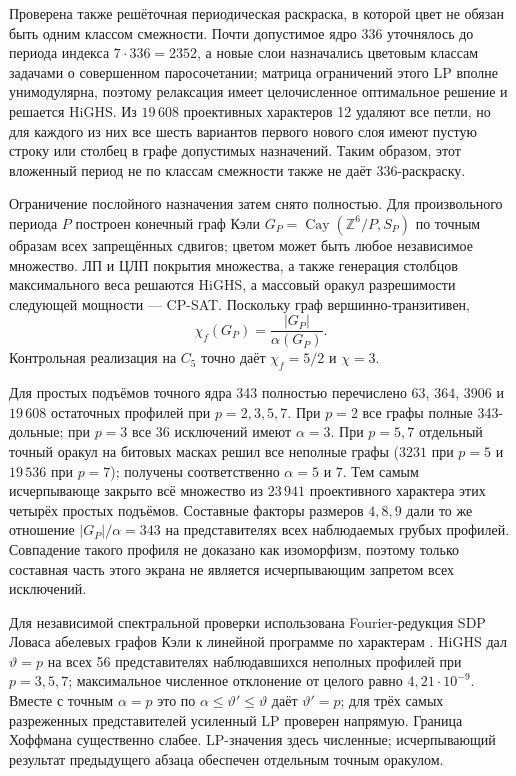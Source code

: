 Проверена также решёточная периодическая раскраска, в которой цвет не обязан
быть одним классом смежности. Почти допустимое ядро 336 уточнялось до периода
индекса $7\cdot336=2352$, а новые слои назначались цветовым классам задачами
о совершенном паросочетании; матрица ограничений этого LP вполне
унимодулярна, поэтому релаксация имеет целочисленное оптимальное решение и
решается HiGHS. Из $19\,608$ проективных характеров 12 удаляют все петли, но для каждого
из них все шесть вариантов первого нового слоя имеют пустую строку или
столбец в графе допустимых назначений. Таким образом, этот вложенный
период не по классам смежности также не даёт 336-раскраску.

Ограничение послойного назначения затем снято полностью. Для произвольного
периода $P$ построен конечный граф Кэли
$G_P=\operatorname{Cay}(\mathbb Z^6/P,S_P)$ по точным образам всех
запрещённых сдвигов; цветом может быть любое независимое множество.
ЛП и ЦЛП покрытия множества, а также генерация столбцов
максимального веса решаются HiGHS, а массовый
оракул разрешимости следующей мощности --- CP-SAT. Поскольку граф
вершинно-транзитивен,
\[
  \chi_f(G_P)=\frac{|G_P|}{\alpha(G_P)}.
\]
Контрольная реализация на $C_5$ точно даёт $\chi_f=5/2$ и $\chi=3$.

Для простых подъёмов точного ядра 343 полностью перечислено $63$, $364$,
$3906$ и $19\,608$ остаточных профилей при $p=2,3,5,7$. При $p=2$ все графы
полные 343-дольные; при $p=3$ все 36 исключений имеют $\alpha=3$. При $p=5,7$
отдельный точный оракул на битовых масках решил все неполные графы ($3231$
при $p=5$ и $19\,536$ при $p=7$); получены соответственно $\alpha=5$ и $7$.
Тем самым исчерпывающе закрыто всё множество из $23\,941$ проективного
характера этих четырёх простых подъёмов. Составные
факторы размеров $4,8,9$ дали то же отношение $|G_P|/\alpha=343$ на
представителях всех наблюдаемых грубых профилей. Совпадение такого профиля
не доказано как изоморфизм, поэтому только составная часть этого экрана не
является исчерпывающим запретом всех исключений.

Для независимой спектральной проверки использована Fourier-редукция SDP
Ловаса абелевых графов Кэли к линейной программе по характерам
\cite{DeCorteDeLaatVallentin}. HiGHS дал $\vartheta=p$ на всех 56
представителях наблюдавшихся неполных профилей при $p=3,5,7$; максимальное
численное отклонение от целого равно $4{,}21\cdot10^{-9}$. Вместе с точным
$\alpha=p$ это по $\alpha\le\vartheta'\le\vartheta$ даёт
$\vartheta'=p$; для трёх самых разреженных представителей усиленный LP
проверен напрямую. Граница Хоффмана существенно слабее. LP-значения здесь
численные; исчерпывающий результат предыдущего абзаца обеспечен отдельным
точным оракулом.

